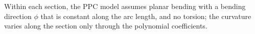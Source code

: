 Within each section, the PPC model assumes planar bending with a bending direction $\phi$ that is constant along the arc length, and no torsion; the curvature varies along the section only through the polynomial coefficients.

